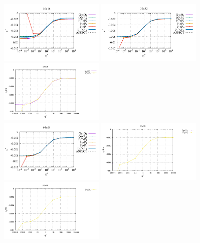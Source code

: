 \begin{center}
\includegraphics[width=5cm]{python_codes/fieldstone_120/paperresults/sinker_reduced/structured/sinker_reduced_vel_16}
\includegraphics[width=5cm]{python_codes/fieldstone_120/paperresults/sinker_reduced/structured/sinker_reduced_vel_32}
\includegraphics[width=5cm]{python_codes/fieldstone_120/paperresults/sinker_reduced/structured/sinker_reduced_vel_48}\\
\includegraphics[width=5cm]{python_codes/fieldstone_120/paperresults/sinker_reduced/structured/sinker_reduced_vel_64}
\includegraphics[width=5cm]{python_codes/fieldstone_120/paperresults/sinker_reduced/structured/sinker_reduced_vel_80}
\includegraphics[width=5cm]{python_codes/fieldstone_120/paperresults/sinker_reduced/structured/sinker_reduced_vel_96}\\

\end{center}

